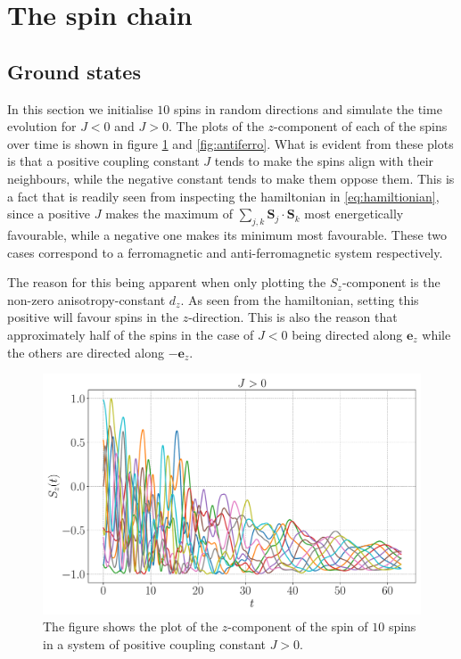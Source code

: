 \section{The spin chain}

\subsection{Ground states}

In this section we initialise $10$ spins in random directions and simulate the time evolution for $J <0$ and $J>0$. The plots of the $z$-component of each of the spins over time is shown in figure \ref{fig:ferro} and \ref{fig:antiferro}. What is evident from these plots is that a positive coupling constant $J$ tends to make the spins align with their neighbours, while the negative constant tends to make them oppose them. This is a fact that is readily seen from inspecting the hamiltonian in \eqref{eq:hamiltionian}, since a positive $J$ makes the maximum of $\sum_{j,k} \mathbf{S}_j \cdot \mathbf{S}_k$ most energetically favourable, while a negative one makes its minimum most favourable. These two cases correspond to a ferromagnetic and anti-ferromagnetic system respectively.

The reason for this being apparent when only plotting the $S_z$-component is the non-zero anisotropy-constant $d_z$. As seen from the hamiltonian, setting this positive will favour spins in the $z$-direction. This is also the reason that approximately half of the spins in the case of $J<0$ being directed along $\mathbf{e}_z$ while the others are directed along $-\mathbf{e}_z$.

\begin{figure}[htb]
	\centering
	\includegraphics[width=\columnwidth]{../fig/gs_ferro.pdf}
	\caption{The figure shows the plot of the $z$-component of the spin of $10$ spins in a system of positive coupling constant $J > 0$.}
	\label{fig:ferro}
\end{figure}

